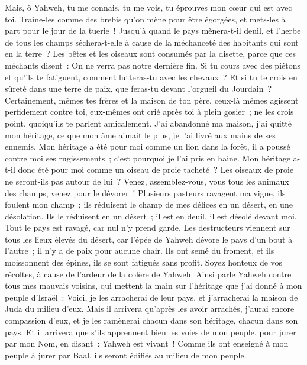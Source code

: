 \begin{multicols}{2}
Mais, ô Yahweh, tu me connais, tu me vois, tu éprouves mon cœur qui est avec toi. Traîne-les comme des brebis qu'on mène pour être égorgées, et mets-les à part pour le jour de la tuerie~!
Jusqu'à quand le pays mènera-t-il deuil, et l'herbe de tous les champs séchera-t-elle à cause de la méchanceté des habitants qui sont en la terre~? Les bêtes et les oiseaux sont consumés par la disette, parce que ces méchants disent~: On ne verra pas notre dernière fin. 
Si tu cours avec des piétons et qu'ils te fatiguent, comment lutteras-tu avec les chevaux~? Et si tu te crois en sûreté dans une terre de paix, que feras-tu devant l'orgueil du Jourdain~?
 Certainement, mêmes tes frères et la maison de ton père, ceux-là mêmes agissent perfidement contre toi, eux-mêmes ont crié après toi à plein gosier~; ne les crois point, quoiqu'ils te parlent amicalement.
J'ai abandonné ma maison, j'ai quitté mon héritage, ce que mon âme aimait le plus, je l'ai livré aux mains de ses ennemis.
Mon héritage a été pour moi comme un lion dans la forêt, il a poussé contre moi ses rugissements~; c'est pourquoi je l'ai pris en haine.
Mon héritage a-t-il donc été pour moi comme un oiseau de proie tacheté~? Les oiseaux de proie ne seront-ils pas autour de lui~? Venez, assemblez-vous, vous tous les animaux des champs, venez pour le dévorer~!
Plusieurs pasteurs ravagent ma vigne, ils foulent mon champ~; ils réduisent le champ de mes délices en un désert, en une désolation.
Ils le réduisent en un désert~; il est en deuil, il est désolé devant moi. Tout le pays est ravagé, car nul n'y prend garde.
Les destructeurs viennent sur tous les lieux élevés du désert, car l'épée de Yahweh dévore le pays d'un bout à l'autre~; il n'y a de paix pour aucune chair.
Ils ont semé du froment, et ils moissonnent des épines, ils se sont fatigués sans profit. Soyez honteux de vos récoltes, à cause de l'ardeur de la colère de Yahweh.
Ainsi parle Yahweh contre tous mes mauvais voisins, qui mettent la main sur l'héritage que j'ai donné à mon peuple d'Israël~: Voici, je les arracherai de leur pays, et j'arracherai la maison de Juda du milieu d'eux.
Mais il arrivera qu'après les avoir arrachés, j'aurai encore compassion d'eux, et je les ramènerai chacun dans son héritage, chacun dans son pays.
Et il arrivera que s'ils apprennent bien les voies de mon peuple, pour jurer par mon Nom, en disant~: Yahweh est vivant~! Comme ils ont enseigné à mon peuple à jurer par Baal, ils seront édifiés au milieu de mon peuple.

\end{multicols}
